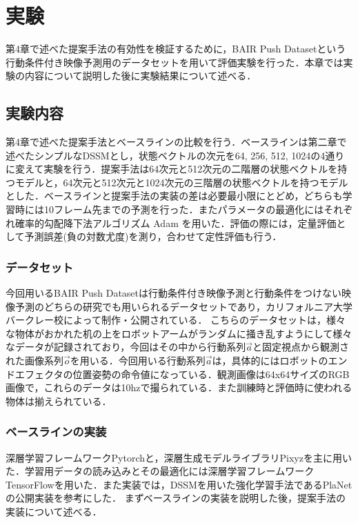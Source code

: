 \chapter{実験}
\label{chap:experiment}
第4章で述べた提案手法の有効性を検証するために，BAIR Push Dataset\cite{ebert2017selfsupervised}という行動条件付き映像予測用のデータセットを用いて評価実験を行った．本章では実験の内容について説明した後に実験結果について述べる．

\section{実験内容}
第4章で述べた提案手法とベースラインの比較を行う．ベースラインは第二章で述べたシンプルなDSSMとし，状態ベクトルの次元を64, 256, 512, 1024の4通りに変えて実験を行う．提案手法は64次元と512次元の二階層の状態ベクトルを持つモデルと，64次元と512次元と1024次元の三階層の状態ベクトルを持つモデルとした．ベースラインと提案手法の実装の差は必要最小限にとどめ，どちらも学習時には10フレーム先までの予測を行った．またパラメータの最適化にはそれぞれ確率的勾配降下法アルゴリズム Adam\cite{kingma2014adam} を用いた．評価の際には，定量評価として予測誤差(負の対数尤度)を測り，合わせて定性評価も行う．

\subsection{データセット}

今回用いるBAIR Push Dataset\cite{ebert2017selfsupervised}は行動条件付き映像予測と行動条件をつけない映像予測のどちらの研究でも用いられるデータセットであり，カリフォルニア大学バークレー校によって制作・公開されている．
こちらのデータセットは，様々な物体がおかれた机の上をロボットアームがランダムに掻き乱すようにして様々なデータが記録されており，今回はその中から行動系列$\vec{a}$と固定視点から観測された画像系列$\vec{o}$を用いる．今回用いる行動系列$\vec{a}$は，具体的にはロボットのエンドエフェクタの位置姿勢の命令値になっている．観測画像は64x64サイズのRGB画像で，これらのデータは10hzで撮られている．また訓練時と評価時に使われる物体は揃えられている．

\subsection{ベースラインの実装}
深層学習フレームワークPytorch\cite{pytorch}と，深層生成モデルライブラリPixyz\cite{pixyz}を主に用いた．学習用データの読み込みとその最適化には深層学習フレームワークTensorFlow\cite{tensorflow}を用いた．また実装では，DSSMを用いた強化学習手法であるPlaNetの公開実装\cite{planet}を参考にした．
まずベースラインの実装を説明した後，提案手法の実装について述べる．

